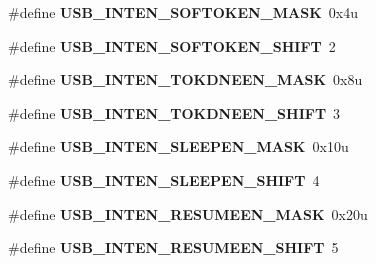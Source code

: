 \begin{DoxyCompactItemize}
\item 
\hypertarget{group___u_s_b___register___masks_ga6398aff7e3278bea66900a35b616563f}{}\#define {\bfseries U\+S\+B\+\_\+\+I\+N\+T\+E\+N\+\_\+\+S\+O\+F\+T\+O\+K\+E\+N\+\_\+\+M\+A\+S\+K}~0x4u\label{group___u_s_b___register___masks_ga6398aff7e3278bea66900a35b616563f}

\item 
\hypertarget{group___u_s_b___register___masks_ga8d9738dcc6d852ffd09dbac5e8058431}{}\#define {\bfseries U\+S\+B\+\_\+\+I\+N\+T\+E\+N\+\_\+\+S\+O\+F\+T\+O\+K\+E\+N\+\_\+\+S\+H\+I\+F\+T}~2\label{group___u_s_b___register___masks_ga8d9738dcc6d852ffd09dbac5e8058431}

\item 
\hypertarget{group___u_s_b___register___masks_ga59b367a1e2496ad06deee9d86001aa7d}{}\#define {\bfseries U\+S\+B\+\_\+\+I\+N\+T\+E\+N\+\_\+\+T\+O\+K\+D\+N\+E\+E\+N\+\_\+\+M\+A\+S\+K}~0x8u\label{group___u_s_b___register___masks_ga59b367a1e2496ad06deee9d86001aa7d}

\item 
\hypertarget{group___u_s_b___register___masks_ga2e0c8229886bcca7e35bee00cd90d236}{}\#define {\bfseries U\+S\+B\+\_\+\+I\+N\+T\+E\+N\+\_\+\+T\+O\+K\+D\+N\+E\+E\+N\+\_\+\+S\+H\+I\+F\+T}~3\label{group___u_s_b___register___masks_ga2e0c8229886bcca7e35bee00cd90d236}

\item 
\hypertarget{group___u_s_b___register___masks_gac2cf7613141a7333e152b43e42e6ee53}{}\#define {\bfseries U\+S\+B\+\_\+\+I\+N\+T\+E\+N\+\_\+\+S\+L\+E\+E\+P\+E\+N\+\_\+\+M\+A\+S\+K}~0x10u\label{group___u_s_b___register___masks_gac2cf7613141a7333e152b43e42e6ee53}

\item 
\hypertarget{group___u_s_b___register___masks_ga8e3c25dd5e743c21fc277d45640d5a5e}{}\#define {\bfseries U\+S\+B\+\_\+\+I\+N\+T\+E\+N\+\_\+\+S\+L\+E\+E\+P\+E\+N\+\_\+\+S\+H\+I\+F\+T}~4\label{group___u_s_b___register___masks_ga8e3c25dd5e743c21fc277d45640d5a5e}

\item 
\hypertarget{group___u_s_b___register___masks_ga9bcc213c102e47e0700cd463b9198470}{}\#define {\bfseries U\+S\+B\+\_\+\+I\+N\+T\+E\+N\+\_\+\+R\+E\+S\+U\+M\+E\+E\+N\+\_\+\+M\+A\+S\+K}~0x20u\label{group___u_s_b___register___masks_ga9bcc213c102e47e0700cd463b9198470}

\item 
\hypertarget{group___u_s_b___register___masks_ga49c43d3fce5392a3d68780ebd02cb5df}{}\#define {\bfseries U\+S\+B\+\_\+\+I\+N\+T\+E\+N\+\_\+\+R\+E\+S\+U\+M\+E\+E\+N\+\_\+\+S\+H\+I\+F\+T}~5\label{group___u_s_b___register___masks_ga49c43d3fce5392a3d68780ebd02cb5df}


\end{DoxyCompactItemize}
